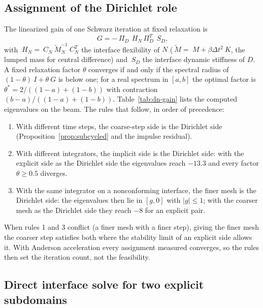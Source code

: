 \documentclass[11pt]{article}
\begin{document}
\subsection{Assignment of the Dirichlet role}
\label{sec:roles}

The linearized gain of one Schwarz iteration at fixed relaxation is
\begin{equation}
  ~G = -\,\Pi_D\, ~H_N\, \Pi_D^T\, ~S_D ,
  \label{eq:gain}
\end{equation}
with $~H_N = ~C_N \tilde{~M}_N^{-1} ~C_N^T$ the interface flexibility of $N$
($\tilde{~M} = ~M + \beta \Delta t^2 ~K$, the lumped mass for central
difference) and $~S_D$ the interface dynamic stiffness of $D$. A fixed
relaxation factor $\theta$ converges if and only if the spectral radius of
$(1 - \theta)~I + \theta ~G$ is below one; for a real spectrum in $[a, b]$
the optimal factor is $\theta^\ast = 2/((1-a) + (1-b))$ with contraction
$(b - a)/((1-a) + (1-b))$. Table~\ref{tab:dn-gain} lists the computed
eigenvalues on the beam. The rules that follow, in order of precedence:
\begin{enumerate}[itemsep=2pt]
\item With different time steps, the coarse-step side is the Dirichlet side
  (Proposition~\ref{prop:subcycled} and the impulse residual).
\item With different integrators, the implicit side is the Dirichlet side:
  with the explicit side as the Dirichlet side the eigenvalues reach
  $-13.3$ and every factor $\theta \ge 0.5$ diverges.
\item With the same integrator on a nonconforming interface, the finer mesh
  is the Dirichlet side: the eigenvalues then lie in $[g, 0]$ with
  $|g| \le 1$; with the coarser mesh as the Dirichlet side they reach $-8$
  for an explicit pair.
\end{enumerate}
When rules 1 and 3 conflict (a finer mesh with a finer step), giving the
finer mesh the coarser step satisfies both where the stability limit of an
explicit side allows it. With Anderson acceleration every assignment
measured converges, so the rules then set the iteration count, not the
feasibility.

\subsection{Direct interface solve for two explicit subdomains}
\label{sec:direct}
\end{document}
